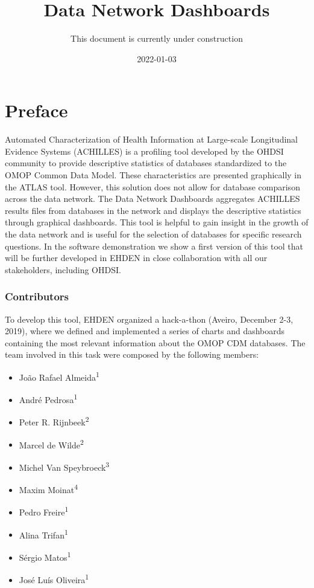 \documentclass[
]{book}
\title{Data Network Dashboards}
\author{This document is currently under construction}
\date{2022-01-03}
\providecommand{\tightlist}{%
  \setlength{\itemsep}{0pt}\setlength{\parskip}{0pt}}
\begin{document}
\maketitle

{
\setcounter{tocdepth}{1}
\tableofcontents
}
\hypertarget{preface}{%
\chapter{Preface}\label{preface}}

Automated Characterization of Health Information at Large-scale Longitudinal Evidence Systems (ACHILLES) is a profiling tool developed by the OHDSI community to provide descriptive statistics of databases standardized to the OMOP Common Data Model. These characteristics are presented graphically in the ATLAS tool. However, this solution does not allow for database comparison across the data network. The Data Network Dashboards aggregates ACHILLES results files from databases in the network and displays the descriptive statistics through graphical dashboards. This tool is helpful to gain insight in the growth of the data network and is useful for the selection of databases for specific research questions. In the software demonstration we show a first version of this tool that will be further developed in EHDEN in close collaboration with all our stakeholders, including OHDSI.

\hypertarget{contributors}{%
\subsection*{Contributors}\label{contributors}}

To develop this tool, EHDEN organized a hack-a-thon (Aveiro, December 2-3, 2019), where we defined and implemented a series of charts and dashboards containing the most relevant information about the OMOP CDM databases. The team involved in this task were composed by the following members:

\begin{itemize}
\tightlist
\item
  João Rafael Almeida\textsuperscript{1}
\item
  André Pedrosa\textsuperscript{1}
\item
  Peter R. Rijnbeek\textsuperscript{2}
\item
  Marcel de Wilde\textsuperscript{2}
\item
  Michel Van Speybroeck\textsuperscript{3}
\item
  Maxim Moinat\textsuperscript{4}
\item
  Pedro Freire\textsuperscript{1}
\item
  Alina Trifan\textsuperscript{1}
\item
  Sérgio Matos\textsuperscript{1}
\item
  José Luís Oliveira\textsuperscript{1}
\end{itemize}
\end{document}
